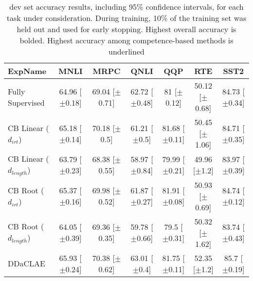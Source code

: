 \begin{table*}[ht]
\centering
\begingroup\small
\begin{tabular}{lcccccc}
  \toprule
ExpName & MNLI & MRPC & QNLI & QQP & RTE & SST2 \\ 
  \midrule
Fully Supervised & 64.96 [$\pm$0.18] & 69.04 [$\pm$0.71] & 62.72 [$\pm$0.48] & 81 [$\pm$0.12] & 50.12 [$\pm$0.68] & 84.73 [$\pm$0.34] \\ 
  CB Linear ($d_{irt}$) & 65.18 [$\pm$0.14] & 70.18 [$\pm$0.5] & 61.21 [$\pm$0.5] & 81.68 [$\pm$0.11] & 50.45 [$\pm$1.06] & 84.71 [$\pm$0.35] \\ 
  CB Linear ($d_{length}$) & 63.79 [$\pm$0.23] & 68.38 [$\pm$0.55] & 58.97 [$\pm$0.84] & 79.99 [$\pm$0.21] & 49.96 [$\pm$1.2] & 83.97 [$\pm$0.39] \\ 
  CB Root ($d_{irt}$) & 65.37 [$\pm$0.16] & 69.98 [$\pm$0.52] & 61.87 [$\pm$0.27] & 81.91 [$\pm$0.08] & 50.93 [$\pm$0.69] & 84.74 [$\pm$0.12] \\ 
  CB Root ($d_{length}$) & 64.05 [$\pm$0.39] & 69.36 [$\pm$0.35] & 59.78 [$\pm$0.66] & 79.5 [$\pm$0.31] & 50.32 [$\pm$1.62] & 83.74 [$\pm$0.43] \\ 
  DDaCLAE & 65.93 [$\pm$0.24] & 70.38 [$\pm$0.62] & 63.01 [$\pm$0.4] & 81.75 [$\pm$0.11] & 52.35 [$\pm$1.2] & 85.7 [$\pm$0.19] \\ 
   \bottomrule
\end{tabular}
\endgroup
\caption{dev set accuracy results, including 95\% confidence intervals, for each task under consideration. During training, 10\% of the training set was held out and used for early stopping. Highest overall accuracy is bolded. Highest accuracy among competence-based methods is underlined} 
\label{tab:acc_lstm-True}
\end{table*}
